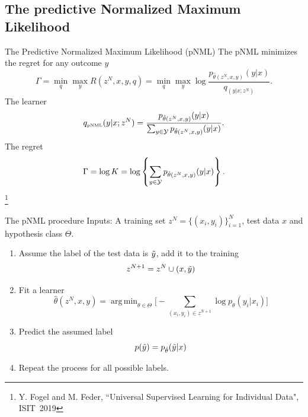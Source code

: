 \documentclass[aspectratio=169]{beamer}
\newcommand\blfootnote[1]{%
  \begingroup
  \renewcommand\thefootnote{}\footnote{#1}%
  \addtocounter{footnote}{-1}%
  \endgroup
}
\def\pNMLSingle{p_{\hat{\theta}(z^N,x,y)} (y|x)}
\DeclareMathOperator*{\argmin}{arg\,min}
\begin{document}
\subsection{The predictive Normalized Maximum Likelihood}
\begin{frame}{The Predictive Normalized Maximum Likelihood (pNML)}
The pNML minimizes the regret for any outcome $y$ 
\begin{equation} 
    \Gamma = \min_q \max_y R(z^N,x,y,q) = \min_q \max_y \log \frac{p_{\hat{\theta}(z^N,x,y)}(y|x)}{q_(y|x;z^N)}.
\end{equation}
The learner
\begin{equation}
    q_{\mbox{\tiny{pNML}}}(y|x;z^N)=\frac{\pNMLSingle}{\sum_{y\in {\cal Y}} \pNMLSingle}.
\end{equation}
The regret
\begin{equation}
    \Gamma = \log K = \log \left\{ \sum_{y\in {\cal Y}} \pNMLSingle \right\}.
\end{equation}
\blfootnote{Y.  Fogel  and  M.  Feder, ``Universal Supervised Learning for Individual Data", ISIT~2019}
\end{frame}




\begin{frame}{The pNML procedure}
Inputs: A training set $z^N=\{(x_i,y_i)\}_{i=1}^N$, test data $x$ and hypothesis class $\Theta$. 
\begin{enumerate}
    \item Assume the label of the test data is $\Tilde{y}$, add it to the training 
    \begin{equation*}
        z^{N+1} = z^N \cup (x,\Tilde{y})
    \end{equation*}
    \item Fit a learner
    \begin{equation*}
        \hat{\theta}(z^N,x,y) = \argmin_{\theta \in \Theta} \bigg[-\sum_{(x_i,y_i)\in z^{N+1}} \log p_{\theta}(y_i|x_i) \bigg]
    \end{equation*}
    \item Predict the assumed label 
    \begin{equation*}
    p(\Tilde{y}) = p_{\hat{\theta}}(\Tilde{y}|x)            
    \end{equation*}
    \pause
    \item Repeat the process for all possible labels.
\end{enumerate}
\end{frame}
\end{document}
